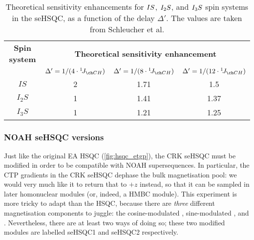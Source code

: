 \begin{table}[!ht]
    \begin{tabular}{cccc}
        \toprule
        \textbf{Spin system} & \multicolumn{3}{c}{\textbf{Theoretical sensitivity enhancement}} \\
        \cmidrule(lr){2-4}
                             & $\Delta' = 1 / (4 \cdot \oneJ{CH})$ & $\Delta' = 1 / (8 \cdot \oneJ{CH})$ & $\Delta' = 1 / (12 \cdot \oneJ{CH})$ \\
        \midrule
        $IS$   & 2 & 1.71 & 1.5  \\
        $I_2S$ & 1 & 1.41 & 1.37 \\
        $I_3S$ & 1 & 1.21 & 1.25 \\
        \bottomrule
    \end{tabular}
    \caption[Theoretical sensitivity enhancements in the seHSQC]{
        Theoretical sensitivity enhancements for $IS\/$, $I_2S\/$, and $I_3S\/$ spin systems in the seHSQC, as a function of the delay $\Delta'$.
        The values are taken from Schleucher et al.\autocite{Schleucher1994JBNMR}
    }
    \label{tbl:sehsqc_theory}
\end{table}


\subsubsection{NOAH seHSQC versions}

Just like the original EA HSQC (\cref{fig:hsqc_etgp}), the CRK seHSQC must be modified in order to be compatible with NOAH supersequences.
In particular, the CTP gradients in the CRK seHSQC dephase the bulk  magnetisation pool: we would very much like it to return that to $+z$ instead, so that it can be sampled in later homonuclear modules (or, indeed, a HMBC module).
This experiment is more tricky to adapt than the HSQC, because there are \textit{three} different magnetisation components to juggle: the cosine-modulated , sine-modulated , and .
Nevertheless, there are at least two ways of doing so; these two modified modules are labelled seHSQC1 and seHSQC2 respectively.

